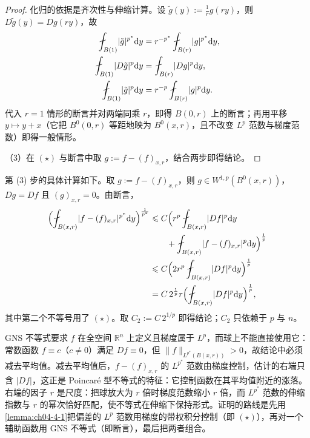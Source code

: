 \documentclass[../../main.tex]{subfiles}%
\begin{document}
\begin{proof}
化归的依据是齐次性与伸缩计算。设 $\tilde g(y):=\frac{1}{r}g(ry)$，则 $D\tilde g(y)=Dg(ry)$，故
\begin{align*}
\fint_{B(1)}\lvert\tilde g\rvert^{p^*}\diff y&=r^{-p^*}\fint_{B(r)}\lvert g\rvert^{p^*}\diff y,\\
\fint_{B(1)}\lvert D\tilde g\rvert^{p}\diff y&=\fint_{B(r)}\lvert Dg\rvert^{p}\diff y,\\
\fint_{B(1)}\lvert\tilde g\rvert^{p}\diff y&=r^{-p}\fint_{B(r)}\lvert g\rvert^{p}\diff y .
\end{align*}
代入 $r=1$ 情形的断言并对两端同乘 $r$，即得 $B(0,r)$ 上的断言；再用平移 $y\mapsto y+x$（它把 $B^{0}(0,r)$ 等距地映为 $B^{0}(x,r)$，且不改变 $L^{p}$ 范数与梯度范数）即得一般情形。

（3）在 $(\star)$ 与断言中取 $g:=f-(f)_{x,r}$，结合两步即得结论。
\end{proof}

第 (3) 步的具体计算如下。取 $g:=f-(f)_{x,r}$，则 $g\in W^{1,p}(B^{0}(x,r))$，$Dg=Df$ 且 $(g)_{x,r}=0$。由断言，
\begin{align*}
\Bigl(\fint_{B(x,r)}\lvert f-(f)_{x,r}\rvert^{p^*}\diff y\Bigr)^{\frac{1}{p^*}}
&\leqslant C\Bigl(r^{p}\fint_{B(x,r)}\lvert Df\rvert^{p}\diff y\\
&\qquad+\fint_{B(x,r)}\lvert f-(f)_{x,r}\rvert^{p}\diff y\Bigr)^{\frac{1}{p}}\\
&\leqslant C\Bigl(2r^{p}\fint_{B(x,r)}\lvert Df\rvert^{p}\diff y\Bigr)^{\frac{1}{p}}\\
&=C\,2^{\frac{1}{p}}r\Bigl(\fint_{B(x,r)}\lvert Df\rvert^{p}\diff y\Bigr)^{\frac{1}{p}},
\end{align*}
其中第二个不等号用了 $(\star)$。取 $C_2:=C\,2^{1/p}$ 即得结论；$C_2$ 只依赖于 $p$ 与 $n$。

\begin{remark}\label{remark:ch04-thm-4-9-动机}
GNS 不等式要求 $f$ 在全空间 $\mathbb{R}^n$ 上定义且梯度属于 $L^{p}$，而球上不能直接使用它：常数函数 $f\equiv c$（$c\neq0$）满足 $Df\equiv0$，但 $\lVert f\rVert_{L^{p^*}(B(x,r))}>0$，故结论中必须减去平均值。减去平均值后，$f-(f)_{x,r}$ 的 $L^{p^*}$ 范数由梯度控制，估计的右端只含 $\lvert Df\rvert$，这正是 Poincaré 型不等式的特征：它控制函数在其平均值附近的涨落。右端的因子 $r$ 是尺度：把球放大为 $r$ 倍时梯度范数缩小 $r$ 倍，而 $L^{p^*}$ 范数的伸缩指数与 $r$ 的幂次恰好匹配，使不等式在伸缩下保持形式。证明的路线是先用\cref{lemma:ch04-4-1}把偏差的 $L^{p}$ 范数用梯度的带权积分控制（即 $(\star)$），再对一个辅助函数用 GNS 不等式（即断言），最后把两者组合。%
\end{remark}
\end{document}
